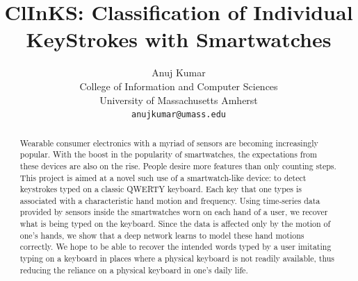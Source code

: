 \documentclass[10pt,twocolumn,letterpaper]{article}
\begin{document}
\title{ClInKS: Classification of Individual KeyStrokes with Smartwatches}

\author{Anuj Kumar\\
College of Information and Computer Sciences\\
University of Massachusetts Amherst\\
{\tt\small anujkumar@umass.edu}
}

\maketitle

\begin{abstract}
  Wearable consumer electronics with a myriad of sensors are becoming increasingly popular. With the boost in the popularity of smartwatches, the expectations from these devices are also on the rise. People desire more features than only counting steps. This project is aimed at a novel such use of a smartwatch-like device: to detect keystrokes typed on a classic QWERTY keyboard. Each key that one types is associated with a characteristic hand motion and frequency. Using time-series data provided by sensors inside the smartwatches worn on each hand of a user, we recover what is being typed on the keyboard. Since the data is affected only by the motion of one's hands, we show that a deep network learns to model these hand motions correctly. We hope to be able to recover the intended words typed by a user imitating typing on a keyboard in places where a physical keyboard is not readily available, thus reducing the reliance on a physical keyboard in one's daily life.
\end{abstract}

\end{document}
